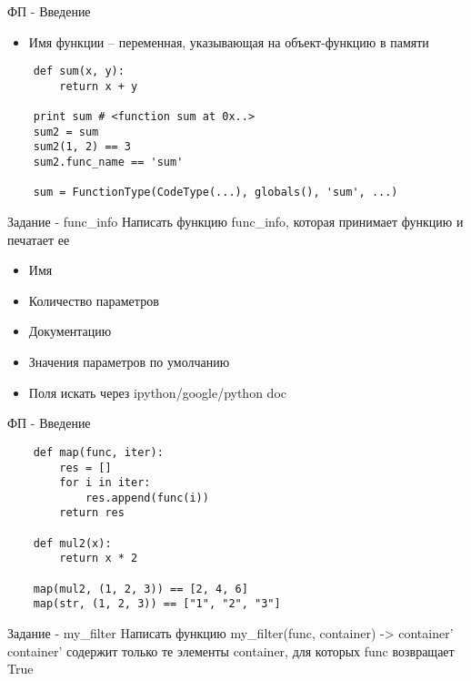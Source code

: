 \documentclass{article}
\begin{document}
{\center ФП - Введение}
\begin{itemize}
    \item Имя функции – переменная, указывающая на объект-функцию в памяти
\end{itemize}
\vspace{15pt}
\begin{lstlisting}
    def sum(x, y):
        return x + y

    print sum # <function sum at 0x..>
    sum2 = sum
    sum2(1, 2) == 3
    sum2.func_name == 'sum'

    sum = FunctionType(CodeType(...), globals(), 'sum', ...)
\end{lstlisting}
\newpage

{\center Задание - func\_info}
    Написать функцию func\_info, которая принимает функцию и печатает ее
    \begin{itemize}
        \item Имя
        \item Количество параметров
        \item Документацию
        \item Значения параметров по умолчанию
        \item Поля искать через ipython/google/python doc
    \end{itemize}
\newpage

{\center ФП - Введение}
\vspace{15pt}
\begin{lstlisting}
    def map(func, iter):
        res = []
        for i in iter:
            res.append(func(i))
        return res

    def mul2(x):
        return x * 2

    map(mul2, (1, 2, 3)) == [2, 4, 6]
    map(str, (1, 2, 3)) == ["1", "2", "3"]
\end{lstlisting}
\newpage

{\center Задание - my\_filter}
Hаписать функцию my\_filter(func, container) -> container'
container' содержит только те элементы container, для которых func возвращает True
\newpage
\end{document}
